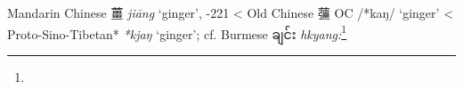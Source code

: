 \begin{etymology}\label{ety:jiang}
Mandarin Chinese {薑} \textit{jiāng} `ginger', -221
< Old Chinese {䕬} \gls{OC} /*kaŋ/ `ginger'
< Proto-Sino-Tibetan* \textit{*kjaŋ} `ginger'; cf. Burmese ချင်း \textit{hkyang:}\footnote{}
\end{etymology}